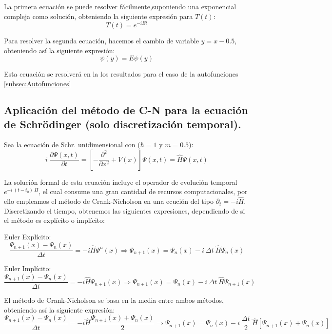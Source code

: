 \documentclass[10pt,onecolumn]{article}
\begin{document}
La primera ecuación se puede resolver fácilmente,suponiendo una exponencial compleja como solución, obteniendo la siguiente expresión para $T(t)$:
\begin{equation}
    T(t) = e^{-i E t}
\end{equation}

Para resolver la segunda ecuación, hacemos el cambio de variable $y = x - 0.5$, obteniendo así la siguiente expresión:
\begin{equation}
    [-\dfrac{d^2}{dy ^2} + \dfrac{\omega^2}{4}\ y^2]\psi(y) = E\psi(y) 
\end{equation}

Esta ecuación se resolverá en la los resultados para el caso de la autofunciones \ref{subsec:Autofunciones}


\subsection{Aplicación del método de C-N para la ecuación de Schrödinger (solo discretización temporal).}

Sea la ecuación de Schr. unidimensional con ($\hbar = 1$ y $m = 0.5$):
\begin{equation}
    i\ \dfrac{\partial \Psi(x,t)}{\partial t} = [-\dfrac{\partial^2}{\partial x ^2} + V(x)]\Psi(x,t) = \hat{H} \Psi(x,t)
\end{equation}

La solución formal de esta ecuación incluye el operador de evolución temporal $e^{-i\ (t-t_0)\  H}$, el cual consume una gran cantidad de recursos computacionales, por ello empleamos el método de Crank-Nicholson en una ecución del tipo $\partial_t = -i \hat{H}$. Discretizando el tiempo, obtenemos las siguientes expresiones, dependiendo de si el método es explícito o implícito:

Euler Explícito:
\begin{equation}
    \dfrac{\Psi_{n+1}(x) - \Psi_n(x)}{\Delta t} = -i \hat{H} \Psi^n(x) \Rightarrow \Psi_{n+1}(x) = \Psi_n(x) - i\ \Delta t\ \hat{H} \Psi_n(x)
\end{equation}

Euler Implícito:
\begin{equation}
    \dfrac{\Psi_{n+1}(x) - \Psi_n(x)}{\Delta t} = -i \hat{H} \Psi_{n+1}(x) \Rightarrow \Psi_{n+1}(x) = \Psi_n(x) - i\ \Delta t\ \hat{H} \Psi_{n+1}(x)
\end{equation}

El método de Crank-Nicholson se basa en la media entre ambos métodos, obteniendo así la siguiente expresión:
\begin{equation}
    \dfrac{\Psi_{n+1}(x) - \Psi_n(x)}{\Delta t} = -i \hat{H} \dfrac{\Psi_{n+1}(x) + \Psi_n(x)}{2} \Rightarrow \Psi_{n+1}(x) = \Psi_n(x) - i\ \dfrac{\Delta t}{2}\ \hat{H} [\Psi_{n+1}(x) + \Psi_n(x)]
\end{equation}
\end{document}
